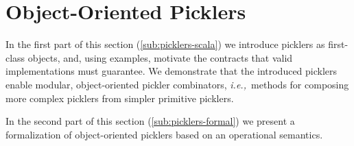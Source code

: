 \documentclass[preprint,10pt]{sigplanconf}
\theoremstyle{definition}
\theoremstyle{definition}
\newcommand{\ie}{{\em i.e.,~}}
\newcommand{\ba}{\begin{array}}
\newcommand{\ea}{\end{array}}
\begin{document}



\section{Object-Oriented Picklers}\label{sec:oopicklers}

In the first part of this section (\ref{sub:picklers-scala}) we introduce
picklers as first-class objects, and, using examples, motivate the contracts
that valid implementations must guarantee. We demonstrate that the introduced
picklers enable modular, object-oriented pickler combinators, \ie methods for
composing more complex picklers from simpler primitive picklers.

In the second part of this section (\ref{sub:picklers-formal}) we present a
formalization of object-oriented picklers based on an operational semantics.
\end{document}
